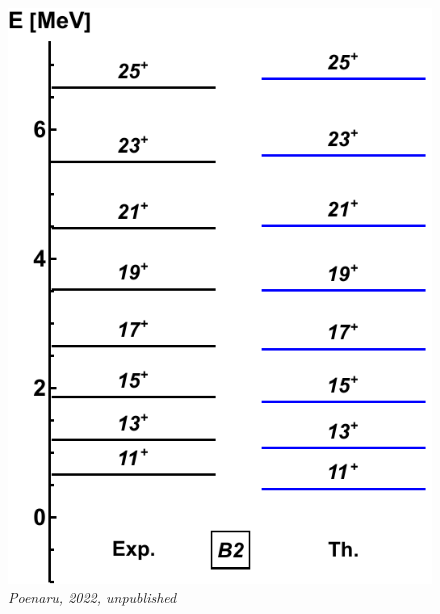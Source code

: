 \documentclass{beamer}
\begin{document}
\begin{frame}
\begin{columns}
\begin{column}{0.25\textwidth}
\begin{figure}
      \includegraphics[scale=0.3]{Figs/ba130-band2.pdf}
      \tiny{\emph{Poenaru, 2022, unpublished}}
    \end{figure}
  \end{column}
\end{columns}
\end{frame}
\end{document}
